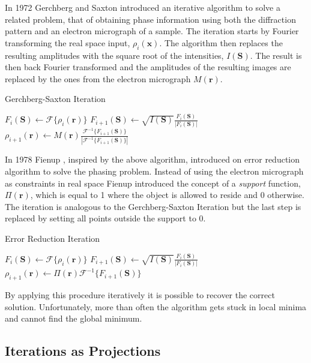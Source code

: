 In 1972 Gerchberg and Saxton \cite{Gerchberg1972Practical} introduced an iterative algorithm to solve
a related problem, that of obtaining phase information using both the
diffraction pattern and an electron micrograph of a sample. The iteration starts
by Fourier transforming the real space input, $\rho_i(\mathbf x)$. The algorithm
then replaces the resulting amplitudes with the square root of the intensities,
$I(\mathbf S)$. The result is then back Fourier transformed and the amplitudes
of the resulting images are replaced by the ones from the electron micrograph $M(\mathbf r)$.
\begin{algorithm}
\caption{Gerchberg-Saxton Iteration}
\begin{algorithmic}
  \STATE $F_{i}(\mathbf S) \gets \mathscr{F}\{\rho_i(\mathbf r)\}$
  \STATE $F_{i+1}(\mathbf S) \gets \sqrt{I(\mathbf S)} \frac{F_i(\mathbf S)}{|F_i(\mathbf S)|}$
  \STATE $\rho_{i+1}(\mathbf r) \gets M(\mathbf r)
  \frac{\mathscr{F}^{-1}\{F_{i+1}(\mathbf
    S)\}}{|\mathscr{F}^{-1}\{F_{i+1}(\mathbf S)\}|}$
\end{algorithmic}
\end{algorithm}

In 1978 Fienup \cite{Fienup1978Reconstruction}, inspired by the above algorithm, introduced on error
reduction algorithm to solve the phasing problem. Instead of using the electron
micrograph as constraints in real space Fienup introduced the concept of a {\em
  support} function, $\Pi(\mathbf r)$, which is equal to 1 where the
object is allowed to reside and 0 otherwise. 
The iteration is analogous to the Gerchberg-Saxton Iteration but the last step is replaced
by setting all points outside the support to 0.
\begin{algorithm}
\caption{Error Reduction Iteration}
\begin{algorithmic}
  \STATE $F_{i}(\mathbf S) \gets \mathscr{F}\{\rho_i(\mathbf r)\}$
  \STATE $F_{i+1}(\mathbf S) \gets \sqrt{I(\mathbf S)} \frac{F_i(\mathbf S)}{|F_i(\mathbf S)|}$
  \STATE $\rho_{i+1}(\mathbf r) \gets \Pi(\mathbf r) \mathscr{F}^{-1}\{F_{i+1}(\mathbf S)\}$
\end{algorithmic}
\end{algorithm}

By applying this procedure iteratively it is possible to recover the correct
solution. 
Unfortunately, 
more than often 
 the algorithm
 gets stuck in
local minima and cannot find the global minimum.

\subsection{Iterations as Projections}

